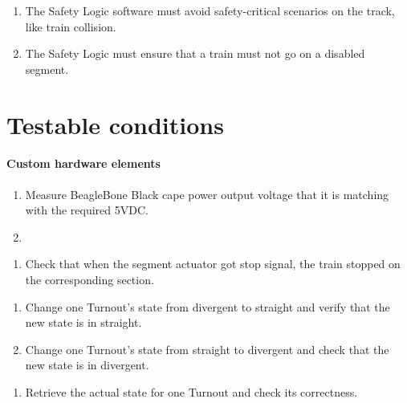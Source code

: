 \begin{enumerate}[label=REQ-SL-\arabic*, leftmargin=*, format=\small]
	\item The Safety Logic software must avoid safety-critical scenarios on the track, like train collision. 
	\item The Safety Logic must ensure that a train must not go on a disabled segment.
\end{enumerate}
	
\section{Testable conditions}


\paragraph{Custom hardware elements}
\begin{enumerate}[label=TEST-BBB-\arabic*, leftmargin=*, format=\small]
	\item Measure BeagleBone Black cape power output voltage that it is matching with the required 5VDC.
	\item {}
\end{enumerate}

\begin{enumerate}[label=TEST-SA-\arabic*, leftmargin=*, format=\small]
	\item Check that when the segment actuator got stop signal, the train stopped on the corresponding section.
\end{enumerate}

\begin{enumerate}[label=TEST-TA-\arabic*, leftmargin=*, format=\small]
	\item Change one Turnout's state from divergent to straight and verify that the new state is in straight.
	\item Change one Turnout's state from straight to divergent and check that the new state is in divergent.
\end{enumerate}

\begin{enumerate}[label=TEST-TD-\arabic*, leftmargin=*, format=\small]
	\item Retrieve the actual state for one Turnout and check its correctness.
\end{enumerate}

